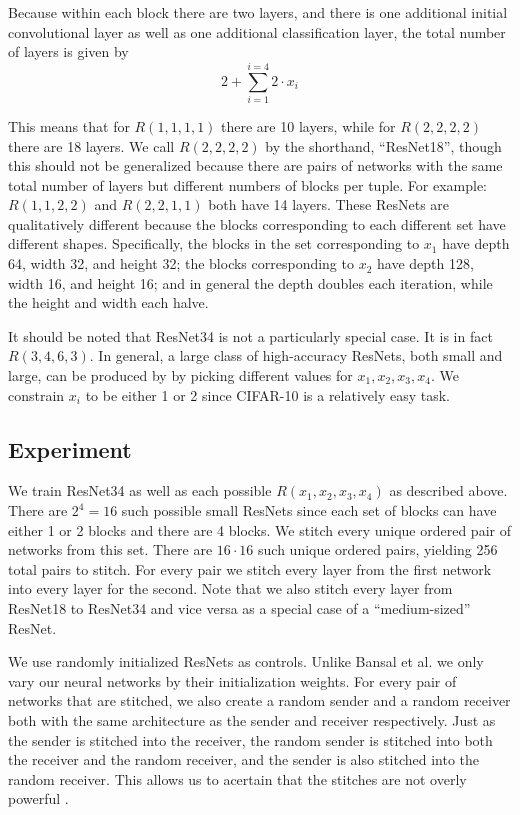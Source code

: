 \documentclass{article} %
\begin{document}
Because within each block there are two layers, and there is one
additional initial convolutional layer as well as one additional classification layer, the total number
of layers is given by
\[2 + \sum_{i=1}^{i=4} 2 \cdot x_i \]

This means that for $R(1, 1, 1, 1)$ there are 10 layers, while for $R(2, 2, 2, 2)$ there are 18 layers. We call
$R(2, 2, 2, 2)$ by the shorthand, ``ResNet18'', though this should not be generalized because there are pairs
of networks with the same total number of layers but different numbers of blocks per tuple. For example:
$R(1, 1, 2, 2)$ and $R(2, 2, 1, 1)$ both have 14 layers. These ResNets are qualitatively different
because the blocks corresponding to each different set have different shapes. Specifically, the blocks in
the set corresponding to $x_1$ have depth 64, width 32, and height 32; the blocks corresponding to $x_2$ have
depth 128, width 16, and height 16; and in general the depth doubles each iteration,
while the height and width each halve.

It should be noted that ResNet34 is not a particularly special case. It is in fact $R(3, 4, 6, 3)$. In general,
a large class of high-accuracy ResNets, both small and large, can be produced by by picking different values for
$x_1, x_2, x_3, x_4$. We constrain $x_i$ to be either 1 or 2 since CIFAR-10 is a relatively easy task.

\subsection*{Experiment}
We train ResNet34 as well as each possible $R(x_1, x_2, x_3, x_4)$ as described above. There are $2^4 = 16$ such possible
small ResNets since each set of blocks can have either 1 or 2 blocks and there are 4 blocks. We stitch every unique ordered
pair of networks from this set. There are $16 \cdot 16$ such unique ordered pairs, yielding 256 total pairs to stitch.
For every pair we stitch every layer from the first network into every layer for the second. Note that we also stitch
every layer from ResNet18 to ResNet34 and vice versa as a special case of a ``medium-sized'' ResNet.

We use randomly initialized ResNets as controls. Unlike Bansal et al. we only vary our neural networks by their
initialization weights. For every pair of networks that are stitched, we also create a random sender and a random
receiver both with the same architecture as the sender and receiver respectively. Just as the sender is stitched
into the receiver, the random sender is stitched into both the receiver and the random receiver, and the sender
is also stitched into the random receiver. This allows us to acertain that the stitches
are not overly powerful \cite{Bansal2021RevisitingMS}.
\end{document}
